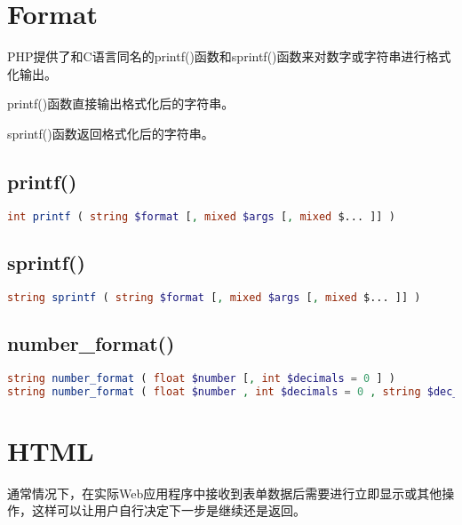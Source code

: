 \section{Format}


PHP提供了和C语言同名的printf()函数和sprintf()函数来对数字或字符串进行格式化输出。


\begin{compactitem}
\item printf()函数直接输出格式化后的字符串。
\item sprintf()函数返回格式化后的字符串。
\end{compactitem}



\subsection{printf()}





\begin{lstlisting}[language=PHP]
int printf ( string $format [, mixed $args [, mixed $... ]] )
\end{lstlisting}


\subsection{sprintf()}




\begin{lstlisting}[language=PHP]
string sprintf ( string $format [, mixed $args [, mixed $... ]] )
\end{lstlisting}

\subsection{number\_format()}


\begin{lstlisting}[language=PHP]
string number_format ( float $number [, int $decimals = 0 ] )
string number_format ( float $number , int $decimals = 0 , string $dec_point = "." , string $thousands_sep = "," )
\end{lstlisting}


\section{HTML}


通常情况下，在实际Web应用程序中接收到表单数据后需要进行立即显示或其他操作，这样可以让用户自行决定下一步是继续还是返回。

